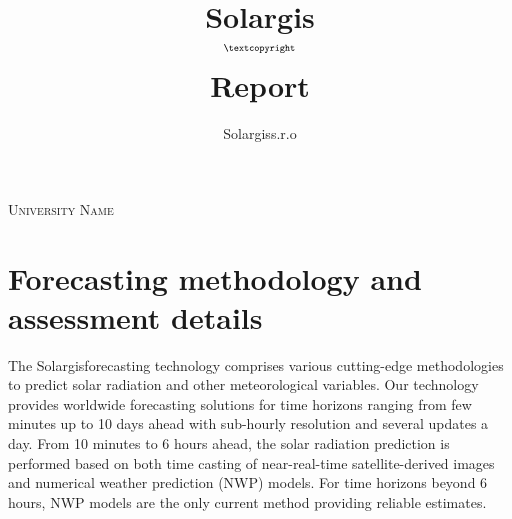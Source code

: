 \documentclass[11pt,a4paper]{article}
\title{Solargis$$^{\textcopyright}$$ Report}
\author{Solargis\texttrademark  s.r.o}
\begin{document}
\maketitle
\textsc{\LARGE University Name}\\[1.5cm]
\thispagestyle{empty}

\newpage
\setcounter{page}{1}

\section{Forecasting methodology and assessment details}
The Solargis\texttrademark forecasting technology comprises various cutting-edge methodologies to predict solar radiation and other meteorological variables. Our technology provides worldwide forecasting solutions for time horizons ranging from few minutes up to 10 days ahead with sub-hourly resolution and several updates a day. From 10 minutes to 6 hours ahead, the solar radiation prediction is performed based on both time casting of near-real-time satellite-derived images and numerical weather prediction (NWP) models. For time horizons beyond 6 hours, NWP models are the only current method providing reliable estimates.
\end{document}
